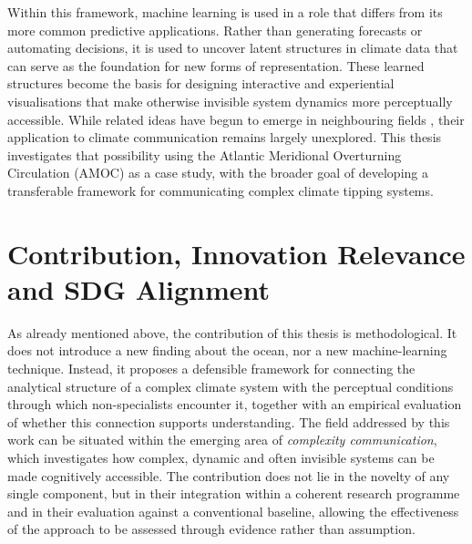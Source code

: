 Within this framework, machine learning is used in a role that differs from its more common predictive applications. Rather than generating forecasts or automating decisions, it is used to uncover latent structures in climate data that can serve as the foundation for new forms of representation. These learned structures become the basis for designing interactive and experiential visualisations that make otherwise invisible system dynamics more perceptually accessible. While related ideas have begun to emerge in neighbouring fields \citep{iten2020}, their application to climate communication remains largely unexplored. This thesis investigates that possibility using the Atlantic Meridional Overturning Circulation (AMOC) as a case study, with the broader goal of developing a transferable framework for communicating complex climate tipping systems.

\section{Contribution, Innovation Relevance and SDG Alignment}
\label{sec:contribution}

As already mentioned above, the contribution of this thesis is methodological. It does not introduce a new finding about the ocean, nor a new machine-learning technique. Instead, it proposes a defensible framework for connecting the analytical structure of a complex climate system with the perceptual conditions through which non-specialists encounter it, together with an empirical evaluation of whether this connection supports understanding. The field addressed by this work can be situated within the emerging area of \emph{complexity communication}, which investigates how complex, dynamic and often invisible systems can be made cognitively accessible. The contribution does not lie in the novelty of any single component, but in their integration within a coherent research programme and in their evaluation against a conventional baseline, allowing the effectiveness of the approach to be assessed through evidence rather than assumption.

